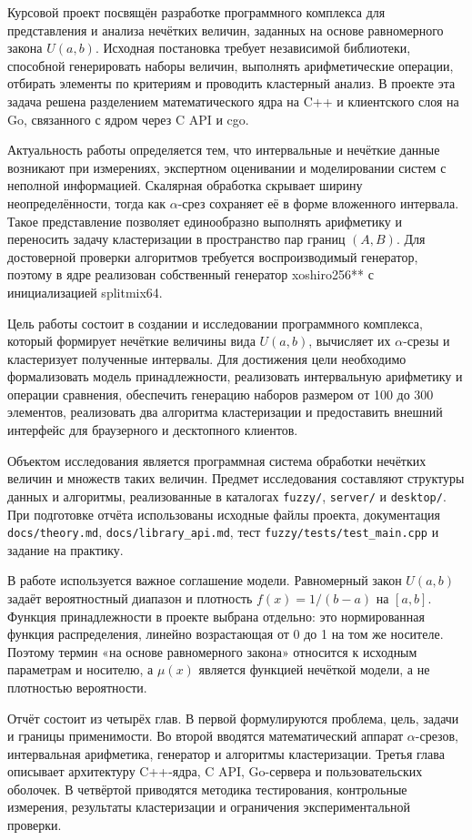Курсовой проект посвящён разработке программного комплекса для представления и анализа нечётких величин, заданных на основе равномерного закона \(U(a,b)\). Исходная постановка требует независимой библиотеки, способной генерировать наборы величин, выполнять арифметические операции, отбирать элементы по критериям и проводить кластерный анализ. В проекте эта задача решена разделением математического ядра на C++ и клиентского слоя на Go, связанного с ядром через C API и cgo.

Актуальность работы определяется тем, что интервальные и нечёткие данные возникают при измерениях, экспертном оценивании и моделировании систем с неполной информацией. Скалярная обработка скрывает ширину неопределённости, тогда как \(\alpha\)-срез сохраняет её в форме вложенного интервала. Такое представление позволяет единообразно выполнять арифметику и переносить задачу кластеризации в пространство пар границ \((A,B)\). Для достоверной проверки алгоритмов требуется воспроизводимый генератор, поэтому в ядре реализован собственный генератор xoshiro256** с инициализацией splitmix64.

Цель работы состоит в создании и исследовании программного комплекса, который формирует нечёткие величины вида \(U(a,b)\), вычисляет их \(\alpha\)-срезы и кластеризует полученные интервалы. Для достижения цели необходимо формализовать модель принадлежности, реализовать интервальную арифметику и операции сравнения, обеспечить генерацию наборов размером от 100 до 300 элементов, реализовать два алгоритма кластеризации и предоставить внешний интерфейс для браузерного и десктопного клиентов.

Объектом исследования является программная система обработки нечётких величин и множеств таких величин. Предмет исследования составляют структуры данных и алгоритмы, реализованные в каталогах \texttt{fuzzy/}, \texttt{server/} и \texttt{desktop/}. При подготовке отчёта использованы исходные файлы проекта, документация \texttt{docs/theory.md}, \texttt{docs/library\_api.md}, тест \texttt{fuzzy/tests/test\_main.cpp} и задание на практику.

В работе используется важное соглашение модели. Равномерный закон \(U(a,b)\) задаёт вероятностный диапазон и плотность \(f(x)=1/(b-a)\) на \([a,b]\). Функция принадлежности в проекте выбрана отдельно: это нормированная функция распределения, линейно возрастающая от 0 до 1 на том же носителе. Поэтому термин «на основе равномерного закона» относится к исходным параметрам и носителю, а \(\mu(x)\) является функцией нечёткой модели, а не плотностью вероятности.

Отчёт состоит из четырёх глав. В первой формулируются проблема, цель, задачи и границы применимости. Во второй вводятся математический аппарат \(\alpha\)-срезов, интервальная арифметика, генератор и алгоритмы кластеризации. Третья глава описывает архитектуру C++-ядра, C API, Go-сервера и пользовательских оболочек. В четвёртой приводятся методика тестирования, контрольные измерения, результаты кластеризации и ограничения экспериментальной проверки.
